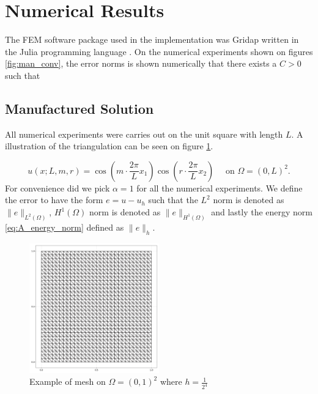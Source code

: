 

\newpage
\section{Numerical Results}%
\label{sec:numerical_results}


The FEM software package used in the implementation was Gridap written in the Julia programming language \cite{verdugo22, julia17}.
On the numerical experiments shown on figures \ref{fig:man_conv},  the error norms is shown numerically that there exists a $C > 0$ such
that


\newpage
\subsection{Manufactured Solution}%
\label{sub:manufactured_solution}

All numerical experiments were carries out on the unit square with length $L$. A illustration of the triangulation can be seen on figure \ref{fig:sol_l1_m1_r1}.

\begin{equation}
    \label{eq:man_sol}
u\left( x; L,m,r \right) = \cos\left(  m\cdot \frac{2\pi}{L}  x_{1}\right)  \cos \left(r\cdot  \frac{2\pi}{L} x_{2} \right) \quad \text{ on }   \Omega =  \left( 0,L  \right)^{2}
.\end{equation}
For convenience did we pick $\alpha = 1$ for all the numerical experiments. We define the error to have the form $e = u - u_{h}$ such that the $L^2$ norm is denoted as $\| e \|_{ L^{2}\left( \Omega  \right)   }^{  } $, $H^{1}\left( \Omega  \right) $
norm is denoted as $\| e \|_{ H^{1}\left( \Omega  \right)  }^{  } $ and lastly the energy norm  \eqref{eq:A_energy_norm} defined as $\| e \|_{ h }^{  } $.

\begin{figure}[tbh!]
    \centering
    \includegraphics[width=0.5\textwidth]{figures/model/l_1.0_m_1_r_1n_30_grid.png}
    \caption{Example of mesh on $ \Omega =  \left( 0,1  \right)^{2}$ where $h=\frac{1}{2^{4}}$  }
    \label{fig:sol_l1_m1_r1}
\end{figure}



